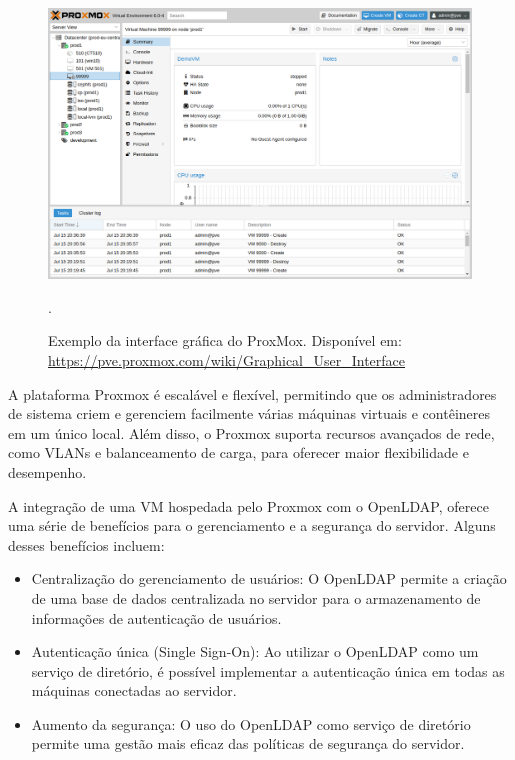 \begin{figure}[h]
    \centering
	\includegraphics[scale=0.7]{textuais/gui-qemu-summary.png}
	\caption[Exemplo da interface gráfica do ProxMox]{Exemplo da interface gráfica do ProxMox. Disponível em: \url{https://pve.proxmox.com/wiki/Graphical\_User\_Interface}}.
	\label{fig:interfaceProxMox}
\end{figure}

A plataforma Proxmox é escalável e flexível, permitindo que os administradores de sistema criem e gerenciem facilmente várias máquinas virtuais e contêineres em um único local. Além disso, o Proxmox suporta recursos avançados de rede, como VLANs e balanceamento de carga, para oferecer maior flexibilidade e desempenho.

A integração de uma VM hospedada pelo Proxmox com o OpenLDAP, oferece uma série de benefícios para o gerenciamento e a segurança do servidor. Alguns desses benefícios incluem:

\begin{itemize}
    \item Centralização do gerenciamento de usuários: O OpenLDAP permite a criação de uma base de dados centralizada no servidor para o armazenamento de informações de autenticação de usuários.
    \item Autenticação única (Single Sign-On): Ao utilizar o OpenLDAP como um serviço de diretório, é possível implementar a autenticação única em todas  as máquinas conectadas ao servidor.
    \item Aumento da segurança: O uso do OpenLDAP como serviço de diretório permite uma gestão mais eficaz das políticas de segurança do servidor.
\end{itemize}